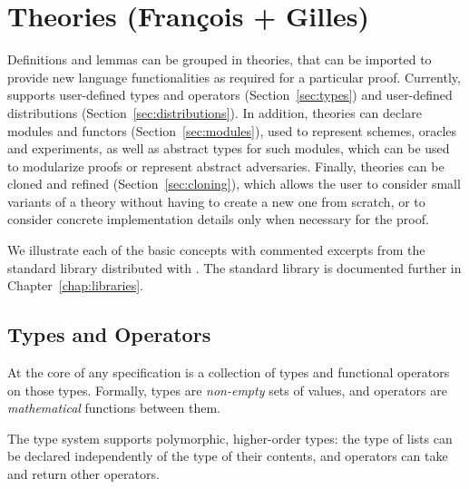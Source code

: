 
\chapter{Theories (Fran\c{c}ois + Gilles)\label{chap:theories}}

Definitions and lemmas can be grouped in theories, that can be imported to
provide new language functionalities as required for a particular proof.
Currently, \EC supports user-defined types and operators
(Section~\ref{sec:types}) and user-defined distributions
(Section~\ref{sec:distributions}). In addition, theories can declare modules and
functors (Section~\ref{sec:modules}), used to represent schemes, oracles and
experiments, as well as abstract types for such modules, which can be used to
modularize proofs or represent abstract adversaries. Finally, theories can be
cloned and refined (Section~\ref{sec:cloning}), which allows the user to
consider small variants of a theory without having to create a new one from
scratch, or to consider concrete implementation details only when necessary for
the proof.

We illustrate each of the basic concepts with commented excerpts from the
standard library distributed with \EC. The standard library is documented
further in Chapter~\ref{chap:libraries}.

\section{Types and Operators\label{sec:types}}

At the core of any \EC specification is a collection of types and functional
operators on those types. Formally, \EC types are \emph{non-empty} sets of
values, and operators are \emph{mathematical} functions between them.


The \EC type system supports polymorphic, higher-order types: the type of lists
can be declared independently of the type of their contents, and operators can
take and return other operators.

